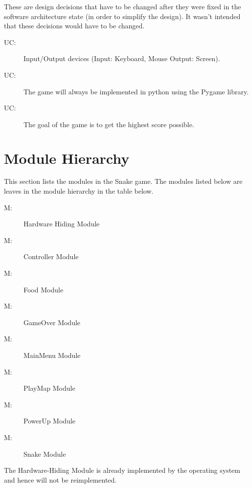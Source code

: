 \documentclass[12pt]{article}
\newcounter{ucnum}
\newcommand{\uctheucnum}{UC\theucnum}
\newcounter{mnum}
\newcommand{\mthemnum}{M\themnum}
\begin{document}
These are design decisions that have to be changed after they were fixed in the software architecture state (in order to simplify the design). It wasn't intended that these decisions would have to be changed.

\begin{description}
\item[ \uctheucnum \label{ucIO}:] Input/Output devices
  (Input: Keyboard, Mouse Output: Screen).
\item[ \uctheucnum \label{ucInput}:] The game will always be implemented in python using the Pygame library.
\item[ \uctheucnum \label{ucOutput}:] The goal of the game is to get the highest score possible.
\end{description}

\section{Module Hierarchy} \label{SecMH}

This section lists the modules in the Snake game. The modules listed below are leaves in the module hierarchy in the table below. 

\begin{description}
\item [ \mthemnum \label{mHH}:] Hardware Hiding Module\
\item [ \mthemnum \label{mHH}:] Controller Module
\item [ \mthemnum \label{mInput}:] Food Module
\item [ \mthemnum \label{mParams}:] GameOver Module
\item [ \mthemnum \label{mOutput}:] MainMenu Module
\item [ \mthemnum \label{mODEs}:] PlayMap Module
\item [ \mthemnum \label{mEnergy}:] PowerUp Module
\item [\refstepcounter{mnum} \mthemnum \label{mSeqDS}:] Snake Module
\end{description}

The Hardware-Hiding Module is already implemented by the operating system and hence will not be reimplemented.
\end{document}
